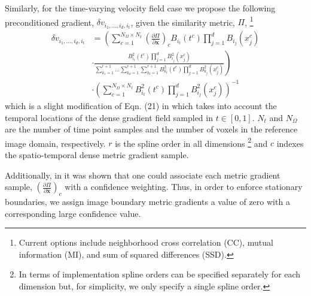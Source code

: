 \documentclass{llncs}
\begin{document}
Similarly, for the time-varying velocity field case we propose the following preconditioned gradient,
$\delta v_{i_1,\ldots,i_d,i_t}$, given the similarity metric, $\Pi$,%
\footnote
{
Current options include neighborhood cross correlation (CC), mutual information (MI), and
sum of squared differences (SSD).
}
\begin{align}
\label{eq:dmffd}
  \delta v_{i_1,\ldots,i_d,i_t} &= \left( \sum_{c=1}^{N_{\Omega} \times N_t} \left( \frac{\partial \Pi}{\partial \mathbf{x}} \right)_c B_{i_t}(t^c)\prod_{j=1}^d B_{i_j}(x_j^c)  \right. \nonumber \\
  &\cdot \left. \frac{B_{i_t}^2(t^c) \prod_{j=1}^d B_{i_j}^2 (x_j^c)} 
  {\sum_{k_1=1}^{r+1}\ldots\sum_{k_d=1}^{r+1} \sum_{k_t=1}^{r+1} B_{k_t}^2(t^c) 
  \prod_{j=1}^d B_{k_j}^2 (x_j^c)} \right) \nonumber \\
  &\cdot\left({\sum_{c=1}^{N_{\Omega}\times N_t}B_{i_t}^2(t^c) \prod_{j=1}^d B_{i_j}^2 (x_j^c)} \right) ^{-1}
\end{align}
which is a slight modification of Eqn. (21)
in \cite{tustison2009} which takes into account the temporal locations of the 
dense gradient field sampled in $t \in [0,1]$. $N_t$ and $N_\Omega$ are the number
of time point samples and the number of voxels in the reference image domain, respectively.
$r$ is the spline order in all dimensions%
\footnote{
In terms of implementation spline orders can be specified separately for each dimension but, for simplicity,
we only specify a single spline order.  
}
and $c$ indexes the spatio-temporal dense metric
gradient sample.

Additionally, in \cite{tustison2006} it was shown that one could associate each 
metric gradient sample, $\left( \frac{\partial \Pi}{\partial \mathbf{x}}\right)_c$ with a confidence
weighting.  Thus, in order to enforce stationary boundaries, we 
assign image boundary metric gradients a value of zero with a corresponding
large confidence value.  

\end{document}
